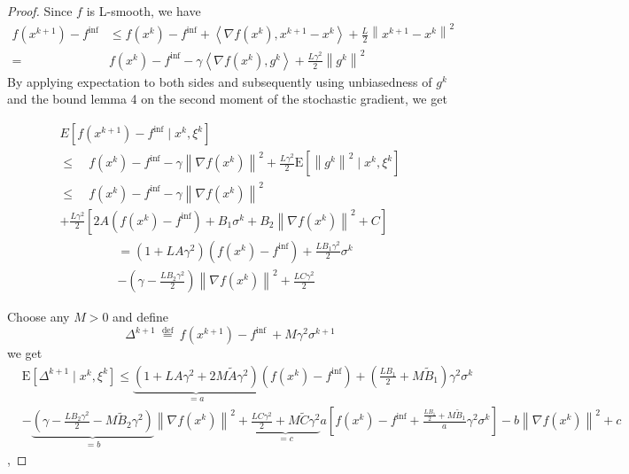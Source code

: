 \documentclass[8pt,a4paper]{article}
\begin{document}
	\begin{proof}
		Since $f$ is L-smooth, we have
		$$
		\begin{aligned}
			f\left(x^{k+1}\right)-f^{\inf } & \leq f\left(x^{k}\right)-f^{\inf }+\left\langle\nabla f\left(x^{k}\right), x^{k+1}-x^{k}\right\rangle+\frac{L}{2}\left\|x^{k+1}-x^{k}\right\|^{2} \\
		{=} & f\left(x^{k}\right)-f^{\inf }-\gamma\left\langle\nabla f\left(x^{k}\right), g^{k}\right\rangle+\frac{L \gamma^{2}}{2}\left\|g^{k}\right\|^{2}
		\end{aligned}
		$$
		By applying expectation to both sides and subsequently using unbiasedness of $g^{k}$ and the bound  lemma 4 on the second moment of the stochastic gradient, we get
	
		$$
		\begin{array}{ll}
		E\left[f\left(x^{k+1}\right)-f^{\inf } \mid x^{k}, \xi^{k}\right]\\{\leq} \quad f\left(x^{k}\right)-f^{\mathrm{inf}}-\gamma\left\|\nabla f\left(x^{k}\right)\right\|^{2}+\frac{L \gamma^{2}}{2} \mathrm{E}\left[\left\|g^{k}\right\|^{2} \mid x^{k}, \xi^{k}\right] \\
		{\leq} \quad f\left(x^{k}\right)-f^{\mathrm{inf}}-\gamma\left\|\nabla f\left(x^{k}\right)\right\|^{2} \\
			+\frac{L \gamma^{2}}{2}\left[2 A\left(f\left(x^{k}\right)-f^{\mathrm{inf}}\right)+B_{1} \sigma^{k}+B_{2}\left\|\nabla f\left(x^{k}\right)\right\|^{2}+C\right]
		\end{array}
		$$
		$$
		\begin{aligned}
			&=\left(1+L A \gamma^{2}\right)\left(f\left(x^{k}\right)-f^{\mathrm{inf}}\right)+\frac{L B_{1} \gamma^{2}}{2} \sigma^{k} \\
			&-\left(\gamma-\frac{L B_{2} \gamma^{2}}{2}\right)\left\|\nabla f\left(x^{k}\right)\right\|^{2}+\frac{L C \gamma^{2}}{2}
		\end{aligned}
		$$
		
		Choose any $M>0$ and define
		$$
		\Delta^{k+1} \stackrel{\text { def }}{=} f\left(x^{k+1}\right)-f^{\text {inf }}+M \gamma^{2} \sigma^{k+1}
		$$
	 we get
		$$
		\begin{aligned}
			&\mathrm{E}\left[\Delta^{k+1} \mid x^{k}, \xi^{k}\right]
	{\leq}
		\underbrace{\left(1+L A \gamma^{2}+2 M \tilde{A} \gamma^{2}\right)}_{=a}\left(f\left(x^{k}\right)-f^{\mathrm{inf}}\right)+\left(\frac{L B_{1}}{2}+M \tilde{B}_{1}\right) \gamma^{2} \sigma^{k}\\
		&-\underbrace{\left(\gamma-\frac{L B_{2} \gamma^{2}}{2}-M \tilde{B}_{2} \gamma^{2}\right)}_{=b}\left\|\nabla f\left(x^{k}\right)\right\|^{2}+\underbrace{\frac{L C \gamma^{2}}{2}+M \tilde{C} \gamma^{2}}_{=c}
		a\left[f\left(x^{k}\right)-f^{\mathrm{inf}}+\frac{\frac{L B_{1}}{2}+M \tilde{B}_{1}}{a} \gamma^{2} \sigma^{k}\right]-b\left\|\nabla f\left(x^{k}\right)\right\|^{2}+c
		\end{aligned}
		$$,
		

\end{proof}
\end{document}

